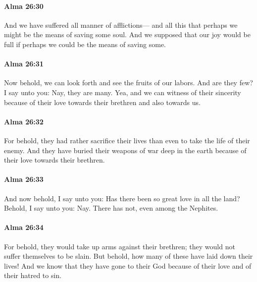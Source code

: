 		\paragraph{Alma 26:30} %
			\label{ALMA-26-30}

			And we have suffered all manner of afflictions---
			and all this that perhaps we might be the means of saving some soul.
			And we supposed that our joy would be full
			if perhaps we could be the means of saving some.

		\paragraph{Alma 26:31} %
			\label{ALMA-26-31}

			Now behold, we can look forth and see the fruits of our labors.
			And are they few?
			I say unto you:
			Nay, they are many.
			Yea, and we can witness of their sincerity
			because of their love towards their brethren and also towards us.

		\paragraph{Alma 26:32} %
			\label{ALMA-26-32}

			For behold, they had rather sacrifice their lives
			than even to take the life of their enemy.
			And they have buried their weapons of war deep in the earth
			because of their love towards their brethren.

		\paragraph{Alma 26:33} %
			\label{ALMA-26-33}

			And now behold, I say unto you:
			Has there been so great love in all the land?
			Behold, I say unto you: Nay.
			There has not, even among the Nephites.

		\paragraph{Alma 26:34} %
			\label{ALMA-26-34}

			For behold, they would take up arms against their brethren;
			they would not suffer themselves to be slain.
			But behold, how many of these have laid down their lives!
			And we know that they have gone to their God
			because of their love and of their hatred to sin.


